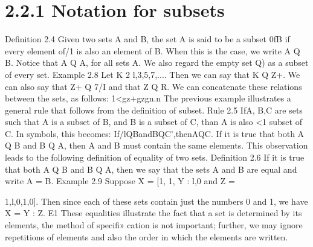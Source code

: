 {{{\smallskip 
\section{2.2.1 Notation for subsets}
\smallskip 
Deﬁnition 2.4 Given two sets A and B, the set A is said to be a subset 0fB if every element
of/1 is also an element of B. When this is the case, we write A Q B.
Notice that A Q A, for all sets A. We also regard the empty set Q) as a subset of every set.
\smallskip 
\smallskip 
Example 2.8 Let K 2 {l,3,5,7,...}. Then we can say that K Q Z+. We can also say that
Z+ Q 7/I and that Z Q R.
We can concatenate these relations between the sets, as follows:
1<gz+gzgn.n
\smallskip 
\smallskip 
The previous example illustrates a general rule that follows from the deﬁnition of subset.
Rule 2.5 IfA, B,C are sets such that A is a subset of B, and B is a subset of C, than A is also
<1 subset of C. In symbols, this becomes:
If/lQBandBQC’,thenAQC.
\smallskip 
\smallskip 
If it is true that both A Q B and B Q A, then A and B must contain the same elements. This
observation leads to the following deﬁnition of equality of two sets.
Deﬁnition 2.6 If it is true that both A Q B and B Q A, then we say that the sets A and B are
equal and write A = B.
\smallskip 
\smallskip 
Example 2.9 Suppose X = {[1, 1}, Y : {l,0} and Z = {1,l,0,1,0]. Then since each of these
sets contain just the numbers 0 and 1, we have X = Y : Z. E1
These equalities illustrate the fact that a set is determined by its elements, the method of speciﬁ»
cation is not important; further, we may ignore repetitions of elements and also the order in which
the elements are written.
\smallskip 
\smallskip 


}}}}
